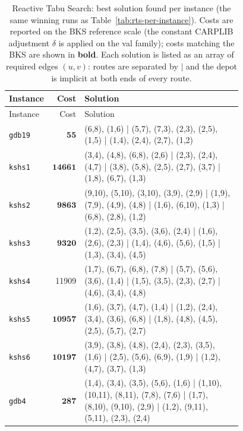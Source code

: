 \begin{landscape}
\begingroup\scriptsize
\begin{longtable}{lr>{\tiny\raggedright\arraybackslash}p{0.78\linewidth}}
\caption{Reactive Tabu Search: best solution found per instance (the same winning runs as Table~\ref{tab:rts-per-instance}). Costs are reported on the BKS reference scale (the constant CARPLIB adjustment $\delta$ is applied on the val family); costs matching the BKS are shown in \textbf{bold}. Each solution is listed as an array of required edges $(u,v)$: routes are separated by $|$ and the depot is implicit at both ends of every route.}\label{tab:rts-solutions}\\
\toprule
Instance & Cost & Solution \\
\midrule
\endfirsthead
\toprule
Instance & Cost & Solution \\
\midrule
\endhead
\bottomrule
\endfoot
\texttt{gdb19} & $\mathbf{55}$ & (6,8), (1,6) | (5,7), (7,3), (2,3), (2,5), (1,5) | (1,4), (2,4), (2,7), (1,2) \\[2pt]
\texttt{kshs1} & $\mathbf{14661}$ & (3,4), (4,8), (6,8), (2,6) | (2,3), (2,4), (4,7) | (3,8), (5,8), (2,5), (2,7), (3,7) | (1,8), (6,7), (1,3) \\[2pt]
\texttt{kshs2} & $\mathbf{9863}$ & (9,10), (5,10), (3,10), (3,9), (2,9) | (1,9), (7,9), (4,9), (4,8) | (1,6), (6,10), (1,3) | (6,8), (2,8), (1,2) \\[2pt]
\texttt{kshs3} & $\mathbf{9320}$ & (1,2), (2,5), (3,5), (3,6), (2,4) | (1,6), (2,6), (2,3) | (1,4), (4,6), (5,6), (1,5) | (1,3), (3,4), (4,5) \\[2pt]
\texttt{kshs4} & 11909 & (1,7), (6,7), (6,8), (7,8) | (5,7), (5,6), (3,6), (1,4) | (1,5), (3,5), (2,3), (2,7) | (4,6), (3,4), (4,8) \\[2pt]
\texttt{kshs5} & $\mathbf{10957}$ & (1,6), (3,7), (4,7), (1,4) | (1,2), (2,4), (3,4), (3,6), (6,8) | (1,8), (4,8), (4,5), (2,5), (5,7), (2,7) \\[2pt]
\texttt{kshs6} & $\mathbf{10197}$ & (3,9), (3,8), (4,8), (2,4), (2,3), (3,5), (1,6) | (2,5), (5,6), (6,9), (1,9) | (1,2), (4,7), (3,7), (1,3) \\[2pt]
\texttt{gdb4} & $\mathbf{287}$ & (1,4), (3,4), (3,5), (5,6), (1,6) | (1,10), (10,11), (8,11), (7,8), (7,6) | (1,7), (8,10), (9,10), (2,9) | (1,2), (9,11), (5,11), (2,3), (2,4) \\[2pt]

\end{longtable}
\end{landscape}
